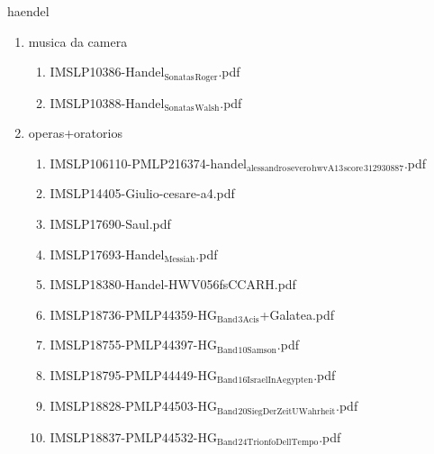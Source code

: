 \documentclass[11pt]{article}
\begin{document}
\item haendel
\label{sec-1-1-1-1-44-37}
\begin{enumerate}
\item musica da camera
\label{sec-1-1-1-1-44-37-1}
\begin{enumerate}
\item IMSLP10386-Handel$_{\text{Sonatas}}$$_{\text{Roger}}$.pdf
\label{sec-1-1-1-1-44-37-1-1}

\item IMSLP10388-Handel$_{\text{Sonatas}}$$_{\text{Walsh}}$.pdf
\label{sec-1-1-1-1-44-37-1-2}
\end{enumerate}

\item operas+oratorios
\label{sec-1-1-1-1-44-37-2}
\begin{enumerate}
\item IMSLP106110-PMLP216374-handel$_{\text{alessandro}}$$_{\text{severo}}$$_{\text{hwvA13}}$$_{\text{score}}$$_{\text{312930887}}$.pdf
\label{sec-1-1-1-1-44-37-2-1}

\item IMSLP14405-Giulio-cesare-a4.pdf
\label{sec-1-1-1-1-44-37-2-2}

\item IMSLP17690-Saul.pdf
\label{sec-1-1-1-1-44-37-2-3}

\item IMSLP17693-Handel$_{\text{Messiah}}$.pdf
\label{sec-1-1-1-1-44-37-2-4}

\item IMSLP18380-Handel-HWV056fsCCARH.pdf
\label{sec-1-1-1-1-44-37-2-5}

\item IMSLP18736-PMLP44359-HG$_{\text{Band}}$$_{\text{3Acis}}$+Galatea.pdf
\label{sec-1-1-1-1-44-37-2-6}

\item IMSLP18755-PMLP44397-HG$_{\text{Band}}$$_{\text{10Samson}}$.pdf
\label{sec-1-1-1-1-44-37-2-7}

\item IMSLP18795-PMLP44449-HG$_{\text{Band}}$$_{\text{16IsraelInAegypten}}$.pdf
\label{sec-1-1-1-1-44-37-2-8}

\item IMSLP18828-PMLP44503-HG$_{\text{Band}}$$_{\text{20SiegDerZeitUWahrheit}}$.pdf
\label{sec-1-1-1-1-44-37-2-9}

\item IMSLP18837-PMLP44532-HG$_{\text{Band}}$$_{\text{24TrionfoDellTempo}}$.pdf
\label{sec-1-1-1-1-44-37-2-10}


\end{enumerate}
\end{enumerate}
\end{document}
